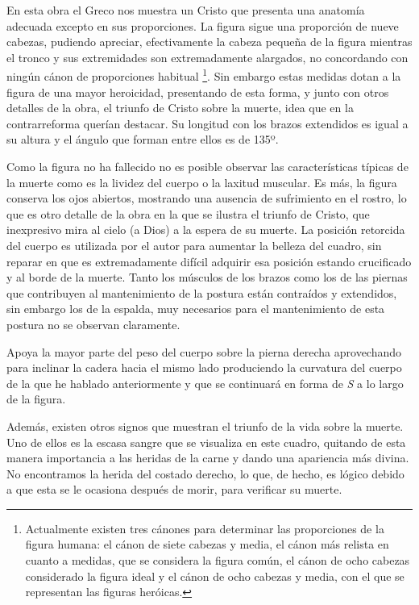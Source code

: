 En esta obra el Greco nos muestra un Cristo que presenta una anatomía adecuada excepto en sus proporciones. La figura sigue una proporción de nueve cabezas, pudiendo apreciar, efectivamente la cabeza pequeña de la figura mientras el tronco y sus extremidades son extremadamente alargados, no concordando con ningún cánon de proporciones habitual \footnote{Actualmente existen tres cánones para determinar las proporciones de la figura humana: el cánon de siete cabezas y media, el cánon más relista en cuanto a medidas, que se considera la figura común, el cánon de ocho cabezas considerado la figura ideal y el cánon de ocho cabezas y media, con el que se representan las figuras heróicas.}. Sin embargo estas medidas dotan a la figura de una mayor heroicidad, presentando de esta forma, y junto con otros detalles de la obra, el triunfo de Cristo sobre la muerte, idea que en la contrarreforma querían destacar. Su longitud con los brazos extendidos es igual a su altura y el ángulo que forman entre ellos es de 135º.

Como la figura no ha fallecido no es posible observar las características típicas de la muerte como es la lividez del cuerpo o la laxitud muscular. Es más, la figura conserva los ojos abiertos, mostrando una ausencia de sufrimiento en el rostro, lo que es otro detalle de la obra en la que se ilustra el triunfo de Cristo, que inexpresivo mira al cielo (a Dios) a la espera de su muerte. La posición retorcida del cuerpo es utilizada por el autor para aumentar la belleza del cuadro, sin reparar en que es extremadamente difícil adquirir esa posición estando crucificado y al borde de la muerte. Tanto los músculos de los brazos como los de las piernas que contribuyen al mantenimiento de la postura están contraídos y extendidos, sin embargo los de la espalda, muy necesarios para el mantenimiento de esta postura no se observan claramente.

Apoya la mayor parte del peso del cuerpo sobre la pierna derecha aprovechando para inclinar la cadera hacia el mismo lado produciendo la curvatura del cuerpo de la que he hablado anteriormente y que se continuará en forma de \textit{S} a lo largo de la figura.

Además, existen otros signos que muestran el triunfo de la vida sobre la muerte. Uno de ellos es la escasa sangre que se visualiza en este cuadro, quitando de esta manera importancia a las heridas de la carne y dando una apariencia más divina. No encontramos la herida del costado derecho, lo que, de hecho, es lógico debido a que esta se le ocasiona después de morir, para verificar su muerte.

